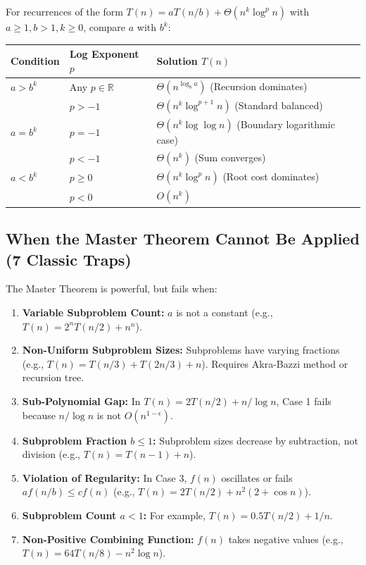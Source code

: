 \documentclass[11pt,a4paper]{article}
\begin{document}
\begin{theorembox}
For recurrences of the form $T(n) = a T(n/b) + \Theta(n^k \log^p n)$ with $a \ge 1, b > 1, k \ge 0$, compare $a$ with $b^k$:

\begin{center}
\begin{tabularx}{\textwidth}{l l X}
\toprule
\textbf{Condition} & \textbf{Log Exponent $p$} & \textbf{Solution $T(n)$} \\
\midrule
$a > b^k$ & Any $p \in \mathbb{R}$ & $\Theta\left(n^{\log_b a}\right)$ \hfill (Recursion dominates) \\
\midrule
\multirow{3}{*}{$a = b^k$} & $p > -1$ & $\Theta\left(n^k \log^{p+1} n\right)$ \hfill (Standard balanced) \\
& $p = -1$ & $\Theta\left(n^k \log \log n\right)$ \hfill (Boundary logarithmic case) \\
& $p < -1$ & $\Theta\left(n^k\right)$ \hfill (Sum converges) \\
\midrule
$a < b^k$ & $p \ge 0$ & $\Theta\left(n^k \log^p n\right)$ \hfill (Root cost dominates) \\
& $p < 0$ & $O\left(n^k\right)$ \\
\bottomrule
\end{tabularx}
\end{center}
\end{theorembox}

\subsection{When the Master Theorem Cannot Be Applied (7 Classic Traps)}
The Master Theorem is powerful, but fails when:
\begin{enumerate}[itemsep=2pt]
    \item \textbf{Variable Subproblem Count:} $a$ is not a constant (e.g., $T(n) = 2^n T(n/2) + n^n$).
    \item \textbf{Non-Uniform Subproblem Sizes:} Subproblems have varying fractions (e.g., $T(n) = T(n/3) + T(2n/3) + n$). Requires Akra-Bazzi method or recursion tree.
    \item \textbf{Sub-Polynomial Gap:} In $T(n) = 2T(n/2) + n/\log n$, Case 1 fails because $n/\log n$ is not $O(n^{1-\epsilon})$.
    \item \textbf{Subproblem Fraction $b \le 1$:} Subproblem sizes decrease by subtraction, not division (e.g., $T(n) = T(n-1) + n$).
    \item \textbf{Violation of Regularity:} In Case 3, $f(n)$ oscillates or fails $a f(n/b) \le c f(n)$ (e.g., $T(n) = 2T(n/2) + n^2 (2 + \cos n)$).
    \item \textbf{Subproblem Count $a < 1$:} For example, $T(n) = 0.5 T(n/2) + 1/n$.
    \item \textbf{Non-Positive Combining Function:} $f(n)$ takes negative values (e.g., $T(n) = 64T(n/8) - n^2 \log n$).
\end{enumerate}
\end{document}

